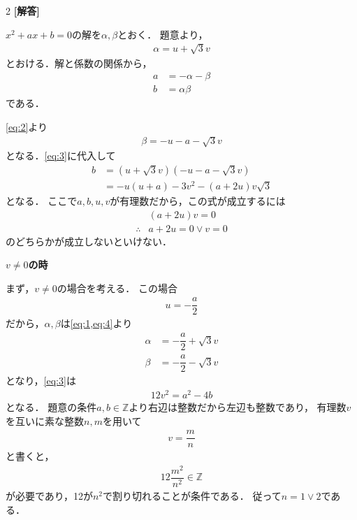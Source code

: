\documentclass[../../main.tex]{subfiles}
\begin{document}
\setcounter{equation}{0}
\begin{oframed}
  
\end{oframed}
\setlength{\columnseprule}{0.4pt}
\begin{multicols}{2}
  {\bf [解答]}

  $x^2+ax+b=0$の解を$\alpha,\beta$とおく．
  題意より，
  \begin{align}
    \alpha = u+\sqrt{3}v \label{eq:1}
  \end{align}
  とおける．解と係数の関係から，
  \begin{align}
    a & = -\alpha-\beta \label{eq:2} \\
    b & = \alpha\beta   \label{eq:3}
  \end{align}
  である．

  \cref{eq:2}より
  \begin{align}
    \beta = -u-a-\sqrt{3}v \label{eq:4}
  \end{align}
  となる．\cref{eq:3}に代入して
  \begin{align}
    b
    & = (u+\sqrt{3}v)(-u-a-\sqrt{3}v) \\
    & = -u(u+a)-3v^2 -(a+2u)v\sqrt{3}
  \end{align}
  となる．
  ここで$a,b,u,v$が有理数だから，この式が成立するには
  \begin{align}
    & (a+2u)v = 0         \\
    \therefore
    & a+2u = 0 \lor v = 0
  \end{align}
  のどちらかが成立しないといけない．

  \textbf{$v \neq 0$の時}

  まず，$v\neq 0$の場合を考える．
  この場合
  \begin{align}
    u = -\dfrac{a}{2} \label{eq:5}
  \end{align}
  だから，$\alpha,\beta$は\cref{eq:1,eq:4}より
  \begin{align}
    \alpha & = -\dfrac{a}{2} + \sqrt{3}v \\
    \beta  & = -\dfrac{a}{2} - \sqrt{3}v
  \end{align}
  となり，\cref{eq:3}は
  \begin{align}
    12v^2 = a^2-4b \label{eq:6}
  \end{align}
  となる．
  題意の条件$a,b\in\mathbb{Z}$より右辺は整数だから左辺も整数であり，
  有理数$v$を互いに素な整数$n,m$を用いて
  \begin{align}
    v = \dfrac{m}{n}
  \end{align}
  と書くと，
  \begin{align}
    12\dfrac{m^2}{n^2} \in\mathbb{Z}
  \end{align}
  が必要であり，12が$n^2$で割り切れることが条件である．
  従って$n=1 \lor 2$である．


\end{multicols}
\end{document}
